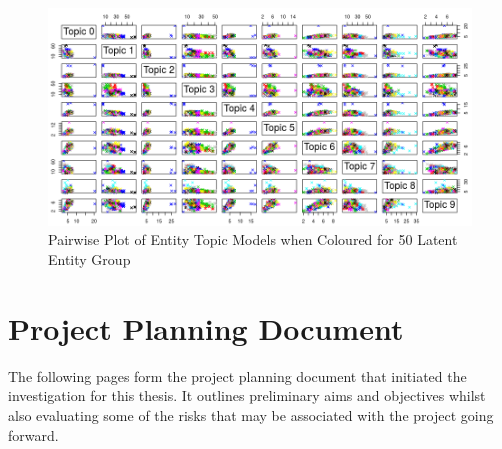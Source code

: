 \documentclass[10pt]{report}
\begin{document}
\begin{appendices}
          \begin{figure}
            \centering
          \includegraphics[angle=-90, scale=0.7]{latent_entity_50}
          \caption{Pairwise Plot of Entity Topic Models when Coloured for 50 Latent Entity Group\label{fig:pairwise_50_le}}
        \end{figure}
          \chapter{Project Planning Document}
  The following pages form the project planning document that initiated the investigation for this thesis. It outlines preliminary aims and objectives whilst also evaluating some of the risks that may be associated with the project going forward.
  


  
\end{appendices}
\end{document}
